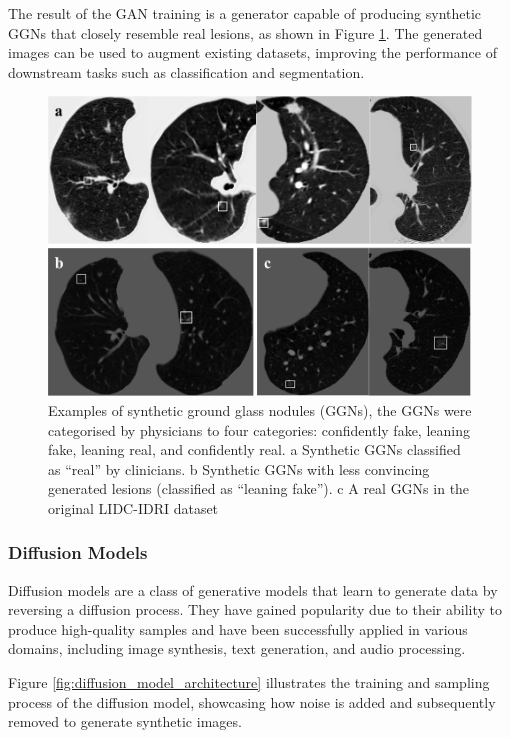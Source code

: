 \documentclass{article}
\begin{document}
The result of the GAN training is a generator capable of producing synthetic GGNs that closely resemble real lesions, as shown in Figure \ref{fig:gan_results}. The generated images can be used to augment existing datasets, improving the performance of downstream tasks such as classification and segmentation.

\begin{figure}[htb]
    \centering
    \includegraphics[width=0.98\linewidth]{images/gan_result.pdf}
    \caption{Examples of synthetic ground glass nodules (GGNs), the GGNs were categorised by physicians to four categories: confidently fake, leaning fake, leaning real, and confidently real. a Synthetic GGNs classified as “real” by clinicians. b Synthetic GGNs with less convincing generated lesions (classified as “leaning fake”). c A real GGNs in the original LIDC-IDRI dataset}
    \label{fig:gan_results}
\end{figure}

\subsubsection{Diffusion Models}
Diffusion models are a class of generative models that learn to generate data by reversing a diffusion process. They have gained popularity due to their ability to produce high-quality samples and have been successfully applied in various domains, including image synthesis, text generation, and audio processing\cite{songScoreBasedGenerativeModeling2021}.

Figure \ref{fig:diffusion_model_architecture} illustrates the training and sampling process of the diffusion model, showcasing how noise is added and subsequently removed to generate synthetic images.
\end{document}
